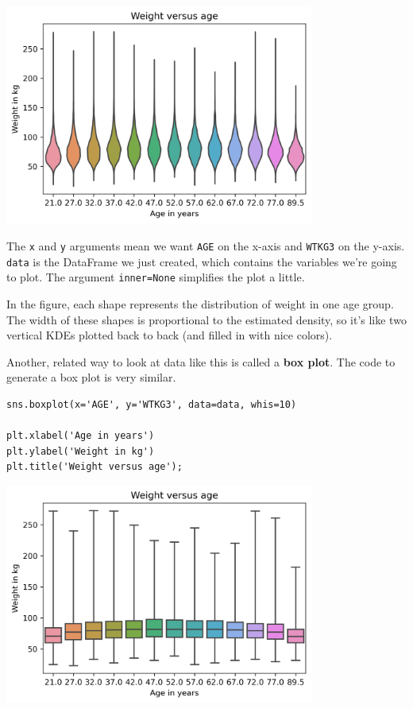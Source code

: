 \begin{center}
\includegraphics[width=4in]{chapters/09_relationships_files/09_relationships_43_0.png}
\end{center}

The \passthrough{\lstinline!x!} and \passthrough{\lstinline!y!}
arguments mean we want \passthrough{\lstinline!AGE!} on the x-axis and
\passthrough{\lstinline!WTKG3!} on the y-axis.
\passthrough{\lstinline!data!} is the DataFrame we just created, which
contains the variables we're going to plot. The argument
\passthrough{\lstinline!inner=None!} simplifies the plot a little.

In the figure, each shape represents the distribution of weight in one
age group. The width of these shapes is proportional to the estimated
density, so it's like two vertical KDEs plotted back to back (and filled
in with nice colors).

Another, related way to look at data like this is called a \textbf{box
plot}. The code to generate a box plot is very similar.

\begin{lstlisting}[]
sns.boxplot(x='AGE', y='WTKG3', data=data, whis=10)

plt.xlabel('Age in years')
plt.ylabel('Weight in kg')
plt.title('Weight versus age');
\end{lstlisting}

\begin{center}
\includegraphics[width=4in]{chapters/09_relationships_files/09_relationships_45_0.png}
\end{center}

